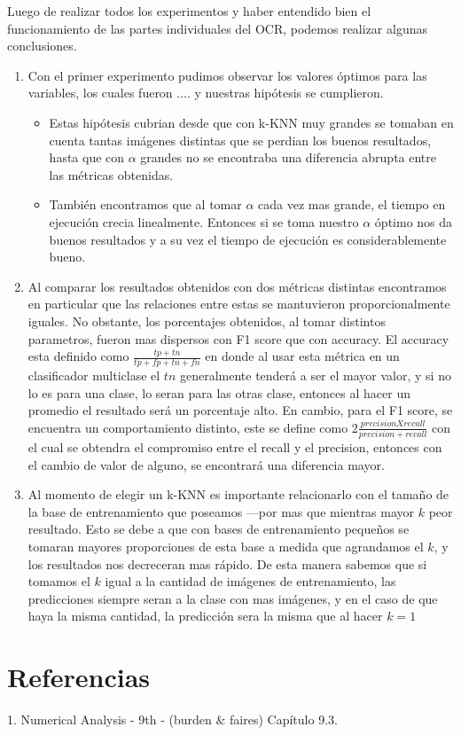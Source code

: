 Luego de realizar todos los experimentos y haber entendido bien el funcionamiento de las partes individuales del OCR, podemos realizar algunas conclusiones.

\begin{enumerate}
	\item Con el primer experimento pudimos observar los valores óptimos para las variables, los cuales fueron .... y nuestras hipótesis se cumplieron. 
	\begin{itemize}
		\item Estas hipótesis cubrian desde que con k-KNN muy grandes se tomaban en cuenta tantas imágenes distintas que se perdian los buenos resultados, hasta que con $\alpha$ grandes no se encontraba una diferencia abrupta entre las métricas obtenidas.
		\item También encontramos que al tomar $\alpha$ cada vez mas grande, el tiempo en ejecución crecia linealmente. Entonces si se toma nuestro $\alpha$ óptimo nos da buenos resultados y a su vez el tiempo de ejecución es considerablemente bueno.
	\end{itemize}
	\item Al comparar los resultados obtenidos con dos métricas distintas encontramos en particular que las relaciones entre estas se mantuvieron proporcionalmente iguales. No obstante, los porcentajes obtenidos, al tomar distintos parametros, fueron mas dispersos con F1 score que con accuracy. El accuracy esta definido como $\frac{tp + tn}{tp + fp + tn + fn}$ en donde al usar esta métrica en un clasificador multiclase el $tn$ generalmente tenderá a ser el mayor valor, y si no lo es para una clase, lo seran para las otras clase, entonces al hacer un promedio el resultado será un porcentaje alto. En cambio, para el F1 score, se encuentra un comportamiento distinto, este se define como 2$\frac{precisionXrecall}{precision + recall}$ con el cual se obtendra el compromiso entre el recall y el precision, entonces con el cambio de valor de alguno, se encontrará una diferencia mayor.
	\item Al momento de elegir un k-KNN es importante relacionarlo con el tamaño de la base de entrenamiento que poseamos ---por mas que mientras mayor $k$ peor resultado. Esto se debe a que con bases de entrenamiento pequeños se tomaran mayores proporciones de esta base a medida que agrandamos el $k$, y los resultados nos decreceran mas rápido. De esta manera sabemos que si tomamos el $k$ igual a la cantidad de imágenes de entrenamiento, las predicciones siempre seran a la clase con mas imágenes, y en el caso de que haya la misma cantidad, la predicción sera la misma que al hacer $k = 1$


\end{enumerate}


\section{Referencias}
1. Numerical Analysis - 9th - (burden $\&$ faires) Capítulo 9.3.